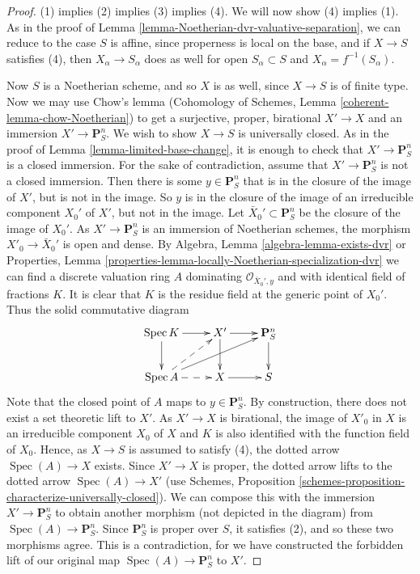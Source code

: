 \documentclass{stacks-project}
\theoremstyle{plain}
\theoremstyle{definition}
\theoremstyle{remark}
\numberwithin{equation}{subsection}
\def\Spec{\mathop{\mathrm{Spec}}}
\begin{document}
\begin{proof}
(1) implies (2) implies (3) implies (4).  We will now show (4) implies
(1).  As in the proof of Lemma \ref{lemma-Noetherian-dvr-valuative-separation},
we can reduce to the
case $S$ is affine, since properness is local on the base, and if $X
\to S$ satisfies (4), then $X_\alpha \to S_\alpha$ does as well for
open $S_\alpha \subset S$ and $X_\alpha = f^{-1}(S_\alpha)$.

\medskip\noindent
Now $S$ is a Noetherian scheme, and so $X$ is as well, since $X \to
S$ is of finite type.  Now we may use Chow's lemma
(Cohomology of Schemes, Lemma \ref{coherent-lemma-chow-Noetherian})
to get a surjective, proper, birational
$X' \to X$ and an immersion $X' \to \mathbf{P}^n_S$.  We wish to
show $X \to S$ is universally closed.  As in the proof of Lemma
\ref{lemma-limited-base-change}, it is enough to check that
$X' \to \mathbf{P}^n_S$ is a closed immersion.
For the sake of contradiction, assume that $X' \to
\mathbf{P}^n_S$ is not a closed immersion.  Then there is some $y
\in \mathbf{P}^n_S$ that is in the closure of the image of $X'$, but
is not in the image.  So $y$ is in the closure of the image of an
irreducible component $X_0'$ of $X'$, but not in the image.
Let $\bar X_0' \subset \mathbf{P}^n_S$ be the closure of
the image of $X_0'$. As $X' \to \mathbf{P}^n_S$ is an immersion
of Noetherian schemes, the morphism $X'_0 \to \bar X_0'$ is
open and dense. By
Algebra, Lemma \ref{algebra-lemma-exists-dvr}
or
Properties, Lemma \ref{properties-lemma-locally-Noetherian-specialization-dvr}
we can find a discrete valuation ring $A$ dominating
$\mathcal{O}_{\bar X_0', y}$ and with identical field
of fractions $K$. It is clear that
$K$ is the residue field at the generic point of $X_0'$.
Thus the solid commutative diagram
\begin{equation}
\label{equation-solid}
\xymatrix{
\Spec K \ar[r] \ar[d] & X' \ar [r] \ar[d] &
\mathbf{P}^n_S \ar[d] \\
\Spec A \ar@{-->}[r] \ar@{-->}[ru] \ar[urr] & X \ar[r] & S\\
}
\end{equation}
Note that the closed point of $A$ maps to $y \in \mathbf{P}^n_S$.  By
construction, there does not exist a set theoretic lift to $X'$.
As $X' \to X$ is birational, the image of $X'_0$ in $X$ is an
irreducible component $X_0$ of $X$ and $K$ is also identified with
the function field of $X_0$. Hence, as $X \to S$ is assumed to satisfy (4),
the dotted arrow $\Spec(A) \to X$ exists.
Since $X' \to X$ is proper, the dotted
arrow lifts to the dotted arrow $\Spec(A) \to X'$ (use Schemes,
Proposition \ref{schemes-proposition-characterize-universally-closed}).
We can compose this with the immersion $X' \to \mathbf{P}^n_S$ to obtain
another morphism (not depicted in the diagram) from
$\Spec(A) \to \mathbf{P}^n_S$.  Since $\mathbf{P}^n_S$
is proper over $S$, it satisfies (2), and so these two morphisms
agree.  This is a contradiction, for we have constructed the
forbidden lift of our original map $\Spec(A) \to \mathbf{P}^n_S$
to $X'$.
\end{proof}
\end{document}
